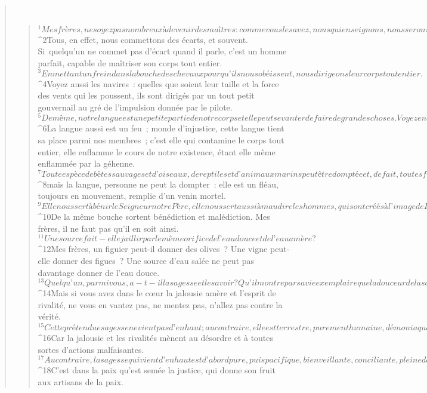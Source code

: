 \begin{verse}
         
      \bchapter{}
      \begin{verse}
${}^{1}Mes frères, ne soyez pas nombreux à devenir des maîtres : comme vous le savez, nous qui enseignons, nous serons jugés plus sévèrement. 
${}^{2}Tous, en effet, nous commettons des écarts, et souvent. Si quelqu’un ne commet pas d’écart quand il parle, c’est un homme parfait, capable de maîtriser son corps tout entier.
${}^{3}En mettant un frein dans la bouche des chevaux pour qu’ils nous obéissent, nous dirigeons leur corps tout entier. 
${}^{4}Voyez aussi les navires : quelles que soient leur taille et la force des vents qui les poussent, ils sont dirigés par un tout petit gouvernail au gré de l’impulsion donnée par le pilote. 
${}^{5}De même, notre langue est une petite partie de notre corps et elle peut se vanter de faire de grandes choses. Voyez encore : un tout petit feu peut embraser une très grande forêt. 
${}^{6}La langue aussi est un feu ; monde d’injustice, cette langue tient sa place parmi nos membres ; c’est elle qui contamine le corps tout entier, elle enflamme le cours de notre existence, étant elle même enflammée par la géhenne. 
${}^{7}Toute espèce de bêtes sauvages et d’oiseaux, de reptiles et d’animaux marins peut être domptée et, de fait, toutes furent domptées par l’espèce humaine ; 
${}^{8}mais la langue, personne ne peut la dompter : elle est un fléau, toujours en mouvement, remplie d’un venin mortel. 
${}^{9}Elle nous sert à bénir le Seigneur notre Père, elle nous sert aussi à maudire les hommes, qui sont créés à l’image de Dieu. 
${}^{10}De la même bouche sortent bénédiction et malédiction. Mes frères, il ne faut pas qu’il en soit ainsi. 
${}^{11}Une source fait-elle jaillir par le même orifice de l’eau douce et de l’eau amère ? 
${}^{12}Mes frères, un figuier peut-il donner des olives ? Une vigne peut-elle donner des figues ? Une source d’eau salée ne peut pas davantage donner de l’eau douce.
${}^{13}Quelqu’un, parmi vous, a-t-il la sagesse et le savoir ? Qu’il montre par sa vie exemplaire que la douceur de la sagesse inspire ses actes. 
${}^{14}Mais si vous avez dans le cœur la jalousie amère et l’esprit de rivalité, ne vous en vantez pas, ne mentez pas, n’allez pas contre la vérité. 
${}^{15}Cette prétendue sagesse ne vient pas d’en haut ; au contraire, elle est terrestre, purement humaine, démoniaque. 
${}^{16}Car la jalousie et les rivalités mènent au désordre et à toutes sortes d’actions malfaisantes. 
${}^{17}Au contraire, la sagesse qui vient d’en haut est d’abord pure, puis pacifique, bienveillante, conciliante, pleine de miséricorde et féconde en bons fruits, sans parti pris, sans hypocrisie. 
${}^{18}C’est dans la paix qu’est semée la justice, qui donne son fruit aux artisans de la paix.
      

\end{verse}
\end{verse}
